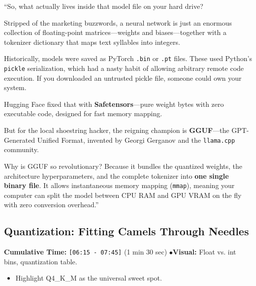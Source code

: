 \documentclass[11pt,a4paper]{article}
\begin{document}
\begin{speechbox}
``So, what actually lives inside that model file on your hard drive?

Stripped of the marketing buzzwords, a neural network is just an enormous collection of floating-point matrices---weights and biases---together with a tokenizer dictionary that maps text syllables into integers.

Historically, models were saved as PyTorch \texttt{.bin} or \texttt{.pt} files. These used Python's \texttt{pickle} serialization, which had a nasty habit of allowing arbitrary remote code execution. If you downloaded an untrusted pickle file, someone could own your system.

Hugging Face fixed that with \textbf{Safetensors}---pure weight bytes with zero executable code, designed for fast memory mapping.

But for the local shoestring hacker, the reigning champion is \textbf{GGUF}---the GPT-Generated Unified Format, invented by Georgi Gerganov and the \texttt{llama.cpp} community.

Why is GGUF so revolutionary? Because it bundles the quantized weights, the architecture hyperparameters, and the complete tokenizer into \textbf{one single binary file}. It allows instantaneous memory mapping (\texttt{mmap}), meaning your computer can split the model between CPU RAM and GPU VRAM on the fly with zero conversion overhead.''
\end{speechbox}

\subsection{Quantization: Fitting Camels Through Needles}
\begin{directionbox}
    \textbf{Cumulative Time:} \texttt{[06:15 - 07:45]} (1 min 30 sec) \quad$\bullet$\quad \textbf{Visual:} Float vs. int bins, quantization table.
    \begin{itemize}
        \item Highlight Q4\_K\_M as the universal sweet spot.
    \end{itemize}
\end{directionbox}
\end{document}

